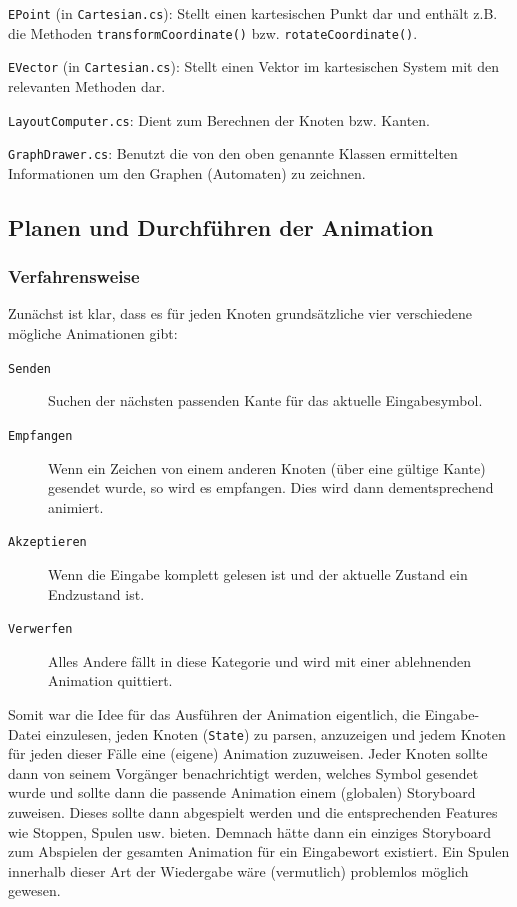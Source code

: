 \begin{description}
	\item{\texttt{EPoint} (in \texttt{Cartesian.cs})}: 
		Stellt einen kartesischen Punkt dar und enthält z.B.  die Methoden
		\texttt{transformCoordinate()} bzw. \texttt{rotateCoordinate()}.

	\item{\texttt{EVector} (in \texttt{Cartesian.cs})}: Stellt einen Vektor im
			kartesischen System mit den relevanten Methoden dar.

	\item{\texttt{LayoutComputer.cs}}: Dient zum Berechnen der Knoten bzw. Kanten.
	\item {\texttt{GraphDrawer.cs}}: Benutzt die von den oben genannte Klassen
		ermittelten Informationen um den Graphen (Automaten) zu zeichnen.
\end{description}
\subsection{Planen und Durchführen der Animation}

\subsubsection{Verfahrensweise}
Zunächst ist klar, dass es für jeden Knoten grundsätzliche vier verschiedene
mögliche Animationen gibt:

\begin{description}
	\item[\texttt{Senden}] Suchen der nächsten passenden Kante für das aktuelle Eingabesymbol.
	\item[\texttt{Empfangen}] Wenn ein Zeichen von einem anderen Knoten (über eine
		gültige Kante) gesendet wurde, so wird es \glqq{}empfangen\grqq{}. Dies wird dann
		dementsprechend animiert.
	\item[\texttt{Akzeptieren}] Wenn die Eingabe komplett gelesen ist und der aktuelle
		Zustand ein Endzustand ist.
	\item[\texttt{Verwerfen}] Alles Andere fällt in diese Kategorie und wird mit einer ablehnenden
		Animation quittiert.
\end{description}

Somit war die Idee für das Ausführen der Animation eigentlich, die
Eingabe-Datei einzulesen, jeden Knoten (\texttt{State}) zu parsen, anzuzeigen und
jedem Knoten für jeden dieser Fälle eine (eigene) Animation zuzuweisen. Jeder
Knoten sollte dann von seinem Vorgänger benachrichtigt werden, welches Symbol
gesendet wurde und sollte dann die passende Animation einem (globalen)
Storyboard zuweisen. Dieses sollte dann abgespielt werden und die
entsprechenden Features wie Stoppen, Spulen usw. bieten. Demnach hätte dann ein
einziges Storyboard zum Abspielen der gesamten Animation für ein Eingabewort
existiert. Ein Spulen innerhalb dieser Art der Wiedergabe wäre (vermutlich)
problemlos möglich gewesen.

